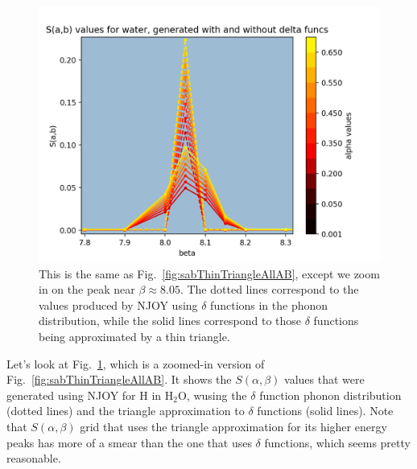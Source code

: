 \documentclass[10pt]{article}
\begin{document}
            \begin{figure}[H]
              \begin{center}
              \includegraphics[scale=0.6]{sab_thinTriangle_and_delta_all_AB_Zoomed}
                \caption{This is the same as Fig.~\ref{fig:sabThinTriangleAllAB}, except we zoom in on the peak near $\beta\approx8.05$. The dotted lines correspond to the values produced by NJOY using $\delta$ functions in the phonon distribution, while the solid lines correspond to those $\delta$ functions being approximated by a thin triangle.}
              \label{fig:sabThinTriangleAllABZoomed}
              \end{center}
            \end{figure}


            Let's look at Fig.~\ref{fig:sabThinTriangleAllABZoomed}, which is a zoomed-in version of Fig.~\ref{fig:sabThinTriangleAllAB}. It shows the $S(\alpha,\beta)$ values that were generated using NJOY for H in H$_2$O, wusing the $\delta$ function phonon distribution (dotted lines) and the triangle approximation to $\delta$ functions (solid lines). Note that $S(\alpha,\beta)$ grid that uses the triangle approximation for its higher energy peaks has more of a smear than the one that uses $\delta$ functions, which seems pretty reasonable.
\end{document}
